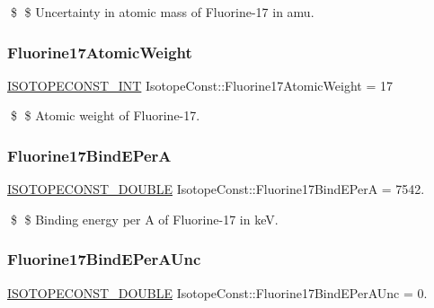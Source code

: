 \$ \$ Uncertainty in atomic mass of Fluorine-\/17 in amu. \mbox{\label{group___isotope_const-_fluorine-_f17_ga5786271498d26fdea646fcb3778ea192}} 
\subsubsection{\texorpdfstring{Fluorine17\+Atomic\+Weight}{Fluorine17AtomicWeight}}
{\footnotesize\ttfamily \mbox{\hyperlink{group___isotope_const-_macros_ga5f18360b3e99483a35c32d789e62621c}{I\+S\+O\+T\+O\+P\+E\+C\+O\+N\+S\+T\+\_\+\+I\+NT}} Isotope\+Const\+::\+Fluorine17\+Atomic\+Weight = 17}

\$ \$ Atomic weight of Fluorine-\/17. \mbox{\label{group___isotope_const-_fluorine-_f17_ga4173b3ed10ce866e122506f937a179a4}} 
\subsubsection{\texorpdfstring{Fluorine17\+Bind\+E\+PerA}{Fluorine17BindEPerA}}
{\footnotesize\ttfamily \mbox{\hyperlink{group___isotope_const-_macros_ga8f45a7272ce02c0b4c65c44636ed719a}{I\+S\+O\+T\+O\+P\+E\+C\+O\+N\+S\+T\+\_\+\+D\+O\+U\+B\+LE}} Isotope\+Const\+::\+Fluorine17\+Bind\+E\+PerA = 7542.}

\$ \$ Binding energy per A of Fluorine-\/17 in keV. \mbox{\label{group___isotope_const-_fluorine-_f17_gac7ff4ebce5519da3068a43c23d0bc069}} 
\subsubsection{\texorpdfstring{Fluorine17\+Bind\+E\+Per\+A\+Unc}{Fluorine17BindEPerAUnc}}
{\footnotesize\ttfamily \mbox{\hyperlink{group___isotope_const-_macros_ga8f45a7272ce02c0b4c65c44636ed719a}{I\+S\+O\+T\+O\+P\+E\+C\+O\+N\+S\+T\+\_\+\+D\+O\+U\+B\+LE}} Isotope\+Const\+::\+Fluorine17\+Bind\+E\+Per\+A\+Unc = 0.}

